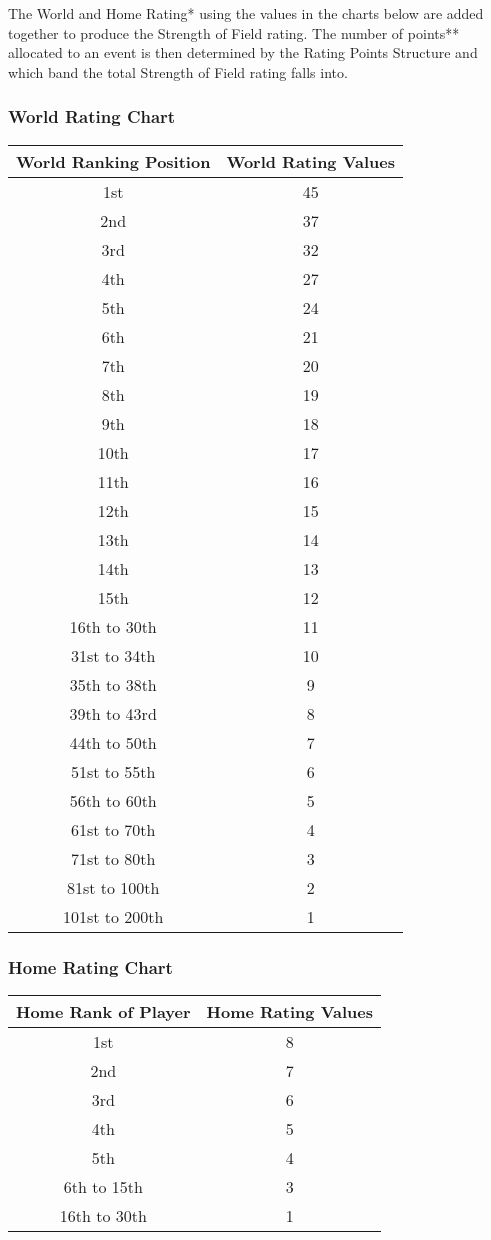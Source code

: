 \documentclass{article}
\begin{document}
The World and Home Rating* using the values in the charts below are added together to produce the Strength of Field rating. The number of points** allocated to an event is then determined by the Rating Points Structure and which band the total Strength of Field rating falls into.

\subsubsection{World Rating Chart}
\begin{center}
\begin{tabular}{ | c | c | }
\hline
World Ranking Position &	World Rating Values\\
\hline
1st &	45\\
2nd &	37\\
3rd	&32\\
4th	&27\\
5th	&24\\
6th	&21\\
7th	&20\\
8th	&19\\
9th	&18\\
10th&	17\\
11th&	16\\
12th&	15\\
13th&	14\\
14th&	13\\
15th&	12\\
16th to 30th&	11\\
31st to 34th&	10\\
35th to 38th	&9\\
39th to 43rd	&8\\
44th to 50th	&7\\
51st to 55th	&6\\
56th to 60th	&5\\
61st to 70th	&4\\
71st to 80th	&3\\
81st to 100th	&2\\
101st to 200th& 	1\\
\hline
\end{tabular}
\end{center}

\subsubsection{Home Rating Chart}

\begin{center}
\begin{tabular}{ | c | c | }
\hline
Home Rank of Player	&Home Rating Values\\
\hline
1st	&8\\
2nd	&7\\
3rd	&6\\
4th	&5\\
5th	&4\\
6th to 15th	&3\\
16th to 30th	&1\\
\hline
\end{tabular}
\end{center}
\end{document}
